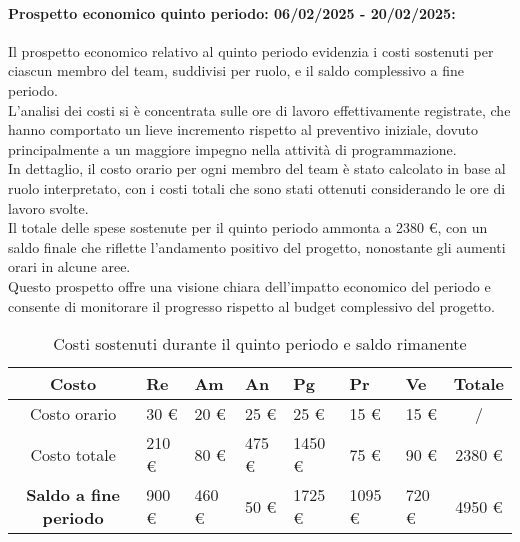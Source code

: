 \paragraph{Prospetto economico quinto periodo: 06/02/2025 - 20/02/2025: }
Il prospetto economico relativo al quinto periodo evidenzia i costi sostenuti per ciascun membro del team, suddivisi per ruolo, e il saldo complessivo a fine periodo.\\
L'analisi dei costi si è concentrata sulle ore di lavoro effettivamente registrate, che hanno comportato un lieve incremento rispetto al preventivo iniziale, dovuto principalmente a un maggiore impegno nella attività di programmazione.\\
In dettaglio, il costo orario per ogni membro del team è stato calcolato in base al ruolo interpretato, con i costi totali che sono stati ottenuti considerando le ore di lavoro svolte.\\
Il totale delle spese sostenute per il quinto periodo ammonta a 2380 \euro, con un saldo finale che riflette l'andamento positivo del progetto, nonostante gli aumenti orari in alcune aree.\\
Questo prospetto offre una visione chiara dell'impatto economico del periodo e consente di monitorare il progresso rispetto al budget complessivo del progetto.
\begin{table}[!h]
    \centering
    \renewcommand{\arraystretch}{1.5}
    \begin{tabularx}{\textwidth}{|c|X|X|X|X|X|X|c|}\hline
    \rowcolor[HTML]{FFD700} 
    \textbf{Costo} & \textbf{Re} & \textbf{Am} & \textbf{An} & \textbf{Pg} & \textbf{Pr} & \textbf{Ve} & \textbf{Totale} \\ \hline
    Costo orario & 30 \euro & 20 \euro & 25 \euro & 25 \euro & 15 \euro & 15 \euro & /  \\ \hline
    Costo totale & 210 \euro & 80 \euro & 475 \euro & 1450 \euro & 75 \euro & 90 \euro & 2380 \euro \\ \hline
    \rowcolor[HTML]{FFD700} 
    \textbf{Saldo a fine periodo}  & 900 \euro & 460 \euro & 50 \euro & 1725 \euro & 1095 \euro & 720 \euro & 4950 \euro \\ \hline
    \end{tabularx}
    \caption{Costi sostenuti durante il quinto periodo e saldo rimanente}
\end{table}


